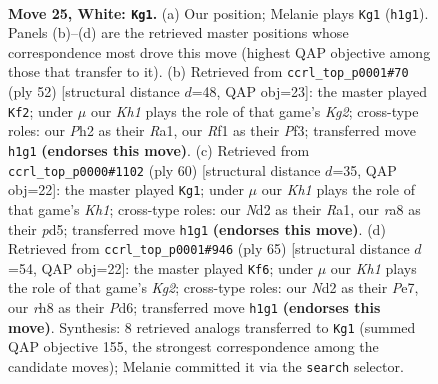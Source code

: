 \documentclass[11pt]{article}
\begin{document}
\clearpage

\begin{figure}[p]\centering
\begin{subfigure}{0.46\textwidth}\centering
\resizebox{\linewidth}{!}{%
\newchessgame
\chessboard[
  setfen={r5kr/8/8/3p2p1/p2n3p/P4P2/3N2PP/R4R1K w - - 0 25},
  showmover=false,
  pgfstyle=straightmove, color=movearrow, markmove={h1-g1}
]}
\caption{}
\end{subfigure}\hfill
\begin{subfigure}{0.46\textwidth}\centering
\resizebox{\linewidth}{!}{%
\newchessgame
\chessboard[
  setfen={r4rk1/1pp5/5n2/2pP3p/p1P2p2/2N2P2/PP4K1/R4R2 w - - 0 27},
  showmover=false,
  pgfstyle=straightmove, color=movearrow, markmove={g2-f2}
]}
\caption{}
\end{subfigure}
\\[4pt]
\begin{subfigure}{0.46\textwidth}\centering
\resizebox{\linewidth}{!}{%
\newchessgame
\chessboard[
  setfen={3r1rk1/7p/b5p1/2ppN3/8/PP3P2/6PP/RR5K w - - 0 31},
  showmover=false,
  pgfstyle=straightmove, color=movearrow, markmove={h1-g1}
]}
\caption{}
\end{subfigure}\hfill
\begin{subfigure}{0.46\textwidth}\centering
\resizebox{\linewidth}{!}{%
\newchessgame
\chessboard[
  setfen={1r2r3/4p1k1/3p2p1/5p2/1p1N4/1P2P2p/P7/R1R4K b - - 1 33},
  showmover=false,
  pgfstyle=straightmove, color=movearrow, markmove={g7-f6}
]}
\caption{}
\end{subfigure}
\caption{\textbf{Move 25, White: \texttt{Kg1}.} (a) Our position; Melanie plays \texttt{Kg1} (\texttt{h1g1}). Panels (b)--(d) are the retrieved master positions whose correspondence most drove this move (highest QAP objective among those that transfer to it). (b) Retrieved from \texttt{ccrl\_top\_p0001\#70} (ply 52) [structural distance $d$=48, QAP obj=23]: the master played \texttt{Kf2}; under $\mu$ our \emph{Kh1} plays the role of that game's \emph{Kg2}; cross-type roles: our \emph{P}h2 as their \emph{R}a1, our \emph{R}f1 as their \emph{P}f3; transferred move \texttt{h1g1} \textbf{(endorses this move)}. (c) Retrieved from \texttt{ccrl\_top\_p0000\#1102} (ply 60) [structural distance $d$=35, QAP obj=22]: the master played \texttt{Kg1}; under $\mu$ our \emph{Kh1} plays the role of that game's \emph{Kh1}; cross-type roles: our \emph{N}d2 as their \emph{R}a1, our \emph{r}a8 as their \emph{p}d5; transferred move \texttt{h1g1} \textbf{(endorses this move)}. (d) Retrieved from \texttt{ccrl\_top\_p0001\#946} (ply 65) [structural distance $d$=54, QAP obj=22]: the master played \texttt{Kf6}; under $\mu$ our \emph{Kh1} plays the role of that game's \emph{Kg2}; cross-type roles: our \emph{N}d2 as their \emph{P}e7, our \emph{r}h8 as their \emph{P}d6; transferred move \texttt{h1g1} \textbf{(endorses this move)}. Synthesis: 8 retrieved analogs transferred to \texttt{Kg1} (summed QAP objective 155, the strongest correspondence among the candidate moves); Melanie committed it via the \texttt{search} selector.}
\label{fig:thought-m48}
\end{figure}
\end{document}
